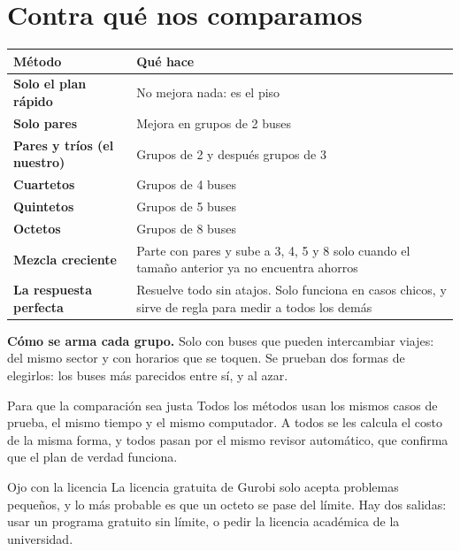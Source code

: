 \documentclass[11pt,a4paper]{article}
\begin{document}
\section{Contra qué nos comparamos}

\begin{center}
\begin{tabularx}{\linewidth}{>{\bfseries}p{4.2cm} X}
\toprule
\rowcolor{azul}\color{white}Método & \color{white}\textbf{Qué hace} \\
\midrule
Solo el plan rápido & No mejora nada: es el piso \\
Solo pares & Mejora en grupos de 2 buses \\
\rowcolor{verdeclaro}Pares y tríos (el nuestro) & Grupos de 2 y después grupos de 3 \\
Cuartetos & Grupos de 4 buses \\
Quintetos & Grupos de 5 buses \\
Octetos & Grupos de 8 buses \\
Mezcla creciente & Parte con pares y sube a 3, 4, 5 y 8 solo cuando el tamaño anterior ya no encuentra ahorros \\
La respuesta perfecta & Resuelve todo sin atajos. Solo funciona en casos chicos, y sirve de regla para medir a todos los demás \\
\bottomrule
\end{tabularx}
\end{center}

\textbf{Cómo se arma cada grupo.} Solo con buses que pueden intercambiar viajes: del mismo sector y con horarios que se toquen. Se prueban dos formas de elegirlos: los buses más parecidos entre sí, y al azar.

\begin{meta}{Para que la comparación sea justa}
Todos los métodos usan los mismos casos de prueba, el mismo tiempo y el mismo computador. A todos se les calcula el costo de la misma forma, y todos pasan por el mismo revisor automático, que confirma que el plan de verdad funciona.
\end{meta}

\begin{ojo}{Ojo con la licencia}
La licencia gratuita de Gurobi solo acepta problemas pequeños, y lo más probable es que un octeto se pase del límite. Hay dos salidas: usar un programa gratuito sin límite, o pedir la licencia académica de la universidad.
\end{ojo}
\end{document}
